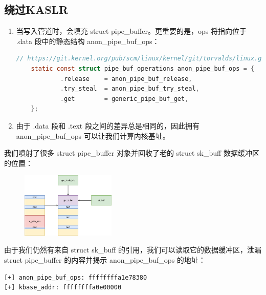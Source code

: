 \documentclass[xcolor=table]{beamer}
\begin{document}
\subsection{绕过KASLR}

\begin{frame}[fragile]

\footnotesize\begin{enumerate}
	\item 当写入管道时，会填充 struct pipe\_buffer。更重要的是，ops 将指向位于 .data 段中的静态结构 anon\_pipe\_buf\_ops：
	\tiny\begin{lstlisting}[language=c]
    // https://git.kernel.org/pub/scm/linux/kernel/git/torvalds/linux.git/tree/fs/pipe.c
    static const struct pipe_buf_operations anon_pipe_buf_ops = {
            .release    = anon_pipe_buf_release,
            .try_steal  = anon_pipe_buf_try_steal,
            .get        = generic_pipe_buf_get,
    };
\end{lstlisting}
	\footnotesize\item 由于 .data 段和 .text 段之间的差异总是相同的，因此拥有 anon\_pipe\_buf\_ops 可以让我们计算内核基址。
\end{enumerate}


\end{frame}

\begin{frame}[fragile]

\small 我们喷射了很多 struct pipe\_buffer 对象并回收了老的 struct sk\_buff 数据缓冲区的位置：

\begin{figure}[H]
\centering
\includegraphics[width=0.4\textwidth]{pic/9}%
\end{figure}

\small 由于我们仍然有来自 struct sk\_buff 的引用，我们可以读取它的数据缓冲区，泄漏 struct pipe\_buffer 的内容并揭示 anon\_pipe\_buf\_ops 的地址：

\tiny\begin{lstlisting}
[+] anon_pipe_buf_ops: ffffffffa1e78380
[+] kbase_addr: ffffffffa0e00000
\end{lstlisting}


\end{frame}
\end{document}
